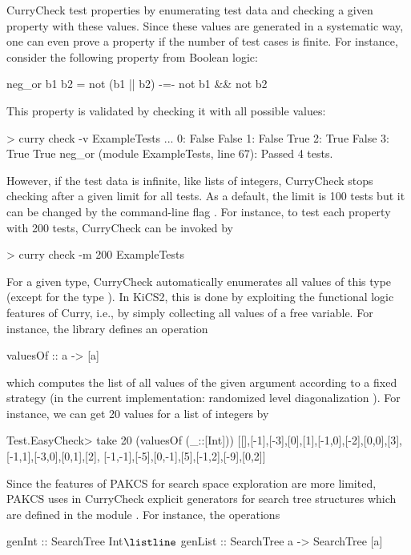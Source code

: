 CurryCheck test properties by enumerating test data and
checking a given property with these values.
Since these values are generated in a systematic way,
one can even prove a property if the number of test cases
is finite. For instance, consider the following property
from Boolean logic:
\begin{curry}
neg_or b1 b2 = not (b1 || b2) -=- not b1 && not b2
\end{curry}
This property is validated by checking it with all possible values:
%
\begin{curry}
> curry check -v ExampleTests
...
0:
False
False
1:
False
True
2:
True
False
3:
True
True
neg_or (module ExampleTests, line 67):
 Passed 4 tests.
\end{curry}
%
However, if the test data is infinite, like lists of integers,
CurryCheck stops checking after a given limit for all tests.
As a default, the limit is 100 tests but it can be changed
by the command-line flag . For instance, to test
each property with 200 tests, CurryCheck can be invoked by
%
\begin{curry}
> curry check -m 200 ExampleTests
\end{curry}
%
For a given type, CurryCheck automatically enumerates all values
of this type (except for the type ).
In KiCS2, this is done by exploiting the functional logic features
of Curry, i.e., by simply collecting all values of a free variable.
For instance, the library 
defines an operation
\begin{curry}
valuesOf :: a -> [a]
\end{curry}
which computes the list of all values of the given argument
according to a fixed strategy (in the current implementation:
randomized level diagonalization \cite{ChristiansenFischer08FLOPS}).
For instance, we can get 20 values for a list of integers by
%
\begin{curry}
Test.EasyCheck> take 20 (valuesOf (_::[Int]))
[[],[-1],[-3],[0],[1],[-1,0],[-2],[0,0],[3],[-1,1],[-3,0],[0,1],[2],
[-1,-1],[-5],[0,-1],[5],[-1,2],[-9],[0,2]]
\end{curry}
%
Since the features of PAKCS for search space exploration are more limited,
PAKCS uses in CurryCheck explicit generators for search tree structures
which are defined in the module .
For instance, the operations
%
\begin{curry}
genInt :: SearchTree Int$\listline$
genList :: SearchTree a -> SearchTree [a]
\end{curry}
